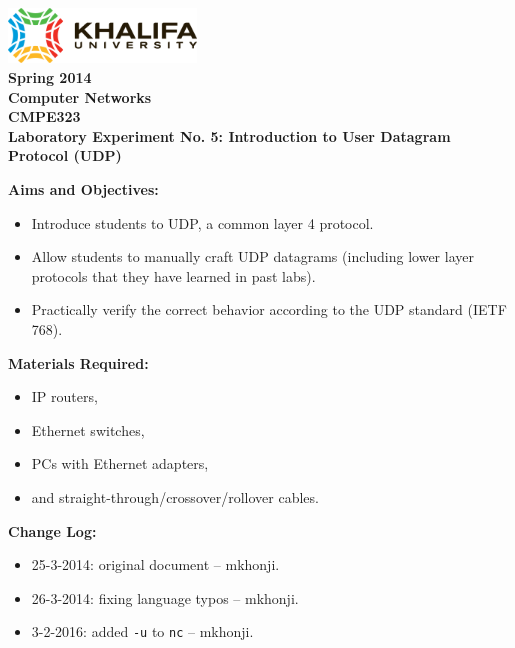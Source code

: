 \documentclass[pdftex,12pt,a4paper]{article}
\begin{document}
    \begin{titlepage}
        \begin{center}
            \includegraphics[width=5cm]{figures/kulogo}\\[1cm]
            {\Large \bfseries
                Spring 2014\\
                Computer Networks\\
                CMPE323\\[1cm]
            }
            {\large \bfseries
                \noindent Laboratory Experiment No. 5: Introduction to User
                Datagram Protocol (UDP)\\[1cm]
            }
        \end{center}

        \noindent \textbf{Aims and Objectives:}
            \begin{itemize}[leftmargin=4cm]
                \item Introduce students to UDP, a common layer 4 protocol.
                \item Allow students to manually craft UDP datagrams (including
                    lower layer protocols that they have learned in past labs).
                \item Practically verify the correct behavior according to the
                    UDP standard (IETF 768).
            \end{itemize}
            \vspace{0.5cm}

        \noindent \textbf{Materials Required:}
            \begin{itemize}[leftmargin=4cm]
                \item IP routers,
                \item Ethernet switches,
                \item PCs with Ethernet adapters,
                \item and straight-through/crossover/rollover cables.
            \end{itemize}
            \vspace{0.5cm}

        \noindent \textbf{Change Log:}
            \begin{itemize}[leftmargin=4cm]
                \item 25-3-2014: original document -- mkhonji.
                \item 26-3-2014: fixing language typos -- mkhonji.
                \item 3-2-2016: added \texttt{-u} to \texttt{nc} -- mkhonji.
            \end{itemize}
    \end{titlepage}
    \newpage
\end{document}
